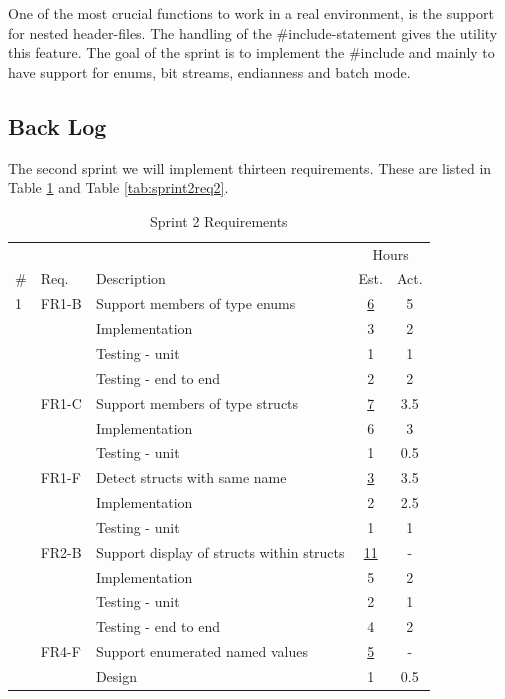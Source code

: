 One of the most crucial functions to work in a real environment, is the support for nested header-files. The handling of the \#include-statement gives the utility this feature. The goal of the sprint is to implement the \#include and mainly to have support for enums, bit streams, endianness and batch mode. 


\subsection{Back Log}
The second sprint we will implement thirteen requirements. These are listed in Table
\ref{tab:sprint2req1} and Table \ref{tab:sprint2req2}.

\begin{table}[!ht] \small \center
\caption{Sprint 2 Requirements\label{tab:sprint2req1}}
\begin{tabularx}{\textwidth}{l l X c c}
	\toprule
	& & & \multicolumn{2}{c}{Hours} \\
	\cmidrule(r){4-5}
	\# & Req. & Description & Est. & Act. \\
	\midrule
	1 & FR1-B & Support members of type enums & \underline{ 6 } & 5 \\
	   &  & Implementation			   	& 3 & 2\\
	   &  & Testing - unit				   	& 1 & 1\\
	   &  & Testing - end to end			& 2 & 2\\
	\addlinespace
	2 & FR1-C & Support members of type structs & \underline{ 7 } & 3.5  \\
	   &  & Implementation			   	& 6 & 3\\
	   &  & Testing - unit				   	& 1 & 0.5\\
	\addlinespace
	3 & FR1-F & Detect structs with same name & \underline{ 3 } &  3.5  \\
	   &  & Implementation			   	& 2 & 2.5\\
	   &  & Testing - unit				   	& 1 & 1\\
	\addlinespace
	4 & FR2-B & Support display of structs within structs & \underline{ 11 } &  -  \\
	   &  & Implementation			   	& 5 & 2\\
	   &  & Testing - unit				   	& 2 & 1\\
	   &  & Testing - end to end			& 4 & 2\\
	\addlinespace
	5 & FR4-F & Support enumerated named values  & \underline{ 5 } &  -  \\
	   &  & Design				   	& 1 & 0.5\\	   

\end{tabularx}
\end{table}
